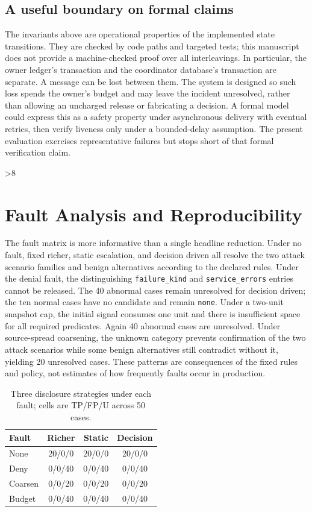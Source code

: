 \documentclass[conference,letterpaper]{IEEEtran}
\begin{document}
\subsection{A useful boundary on formal claims}
The invariants above are operational properties of the implemented state transitions. They are checked by code paths and targeted tests; this manuscript does not provide a machine-checked proof over all interleavings. In particular, the owner ledger's transaction and the coordinator database's transaction are separate. A message can be lost between them. The system is designed so such loss spends the owner's budget and may leave the incident unresolved, rather than allowing an uncharged release or fabricating a decision. A formal model could express this as a safety property under asynchronous delivery with eventual retries, then verify liveness only under a bounded-delay assumption. The present evaluation exercises representative failures but stops short of that formal verification claim.
\fi

\ifnum\PaperLength>8
\section{Fault Analysis and Reproducibility}
The fault matrix is more informative than a single headline reduction. Under no fault, fixed richer, static escalation, and decision driven all resolve the two attack scenario families and benign alternatives according to the declared rules. Under the denial fault, the distinguishing \texttt{failure\_kind} and \texttt{service\_errors} entries cannot be released. The 40 abnormal cases remain unresolved for decision driven; the ten normal cases have no candidate and remain \texttt{none}. Under a two-unit snapshot cap, the initial signal consumes one unit and there is insufficient space for all required predicates. Again 40 abnormal cases are unresolved. Under source-spread coarsening, the unknown category prevents confirmation of the two attack scenarios while some benign alternatives still contradict without it, yielding 20 unresolved cases. These patterns are consequences of the fixed rules and policy, not estimates of how frequently faults occur in production.

\begin{table}[t]
\centering\caption{Three disclosure strategies under each fault; cells are TP/FP/U across 50 cases.}
\label{tab:matrix}\scriptsize
\begin{tabular}{lccc}\hline
Fault & Richer & Static & Decision \\\hline
None &20/0/0&20/0/0&20/0/0\\
Deny &0/0/40&0/0/40&0/0/40\\
Coarsen &0/0/20&0/0/20&0/0/20\\
Budget &0/0/40&0/0/40&0/0/40\\\hline
\end{tabular}
\end{table}
\end{document}
